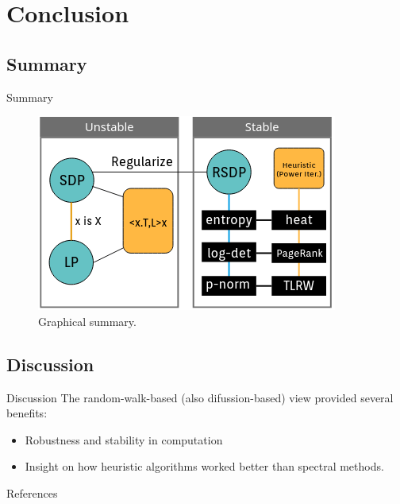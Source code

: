 \documentclass[handout]{beamer}
\begin{document}
    \section{Conclusion}

    \subsection{Summary}
    \begin{frame}{Summary}
        \begin{figure}
            \centering
            \includegraphics[scale=0.7]{imgs/sum.png}
            \caption{Graphical summary.}
            \label{fig:sum}
        \end{figure}
    \end{frame}

    \subsection{Discussion}
    \begin{frame}{Discussion}
        The random-walk-based (also difussion-based) view provided several benefits:        \begin{itemize}
        \item Robustness and stability in computation 
        \item Insight on how heuristic algorithms worked better than spectral methods.
        \end{itemize}
    \end{frame}
    
    \appendix
    \begin{frame}{References}
        \nocite{*}
        
        
    \end{frame}
\end{document}
